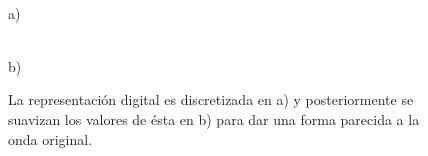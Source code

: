 \begin{figure}[h!]
\centering
\begin{minipage}[c][5cm][t]{.5\textwidth}
\centering

\\a)
\end{minipage}%
\begin{minipage}[c][5cm][t]{.5\textwidth}
\centering

\\b)
\end{minipage}%
\caption[Proceso de cuantificaci\'on]{La representaci\'on digital es discretizada en a) y posteriormente se suavizan los valores de \'esta en b) para dar una forma parecida a la onda original.}
\label{fig:cuant}
\end{figure}